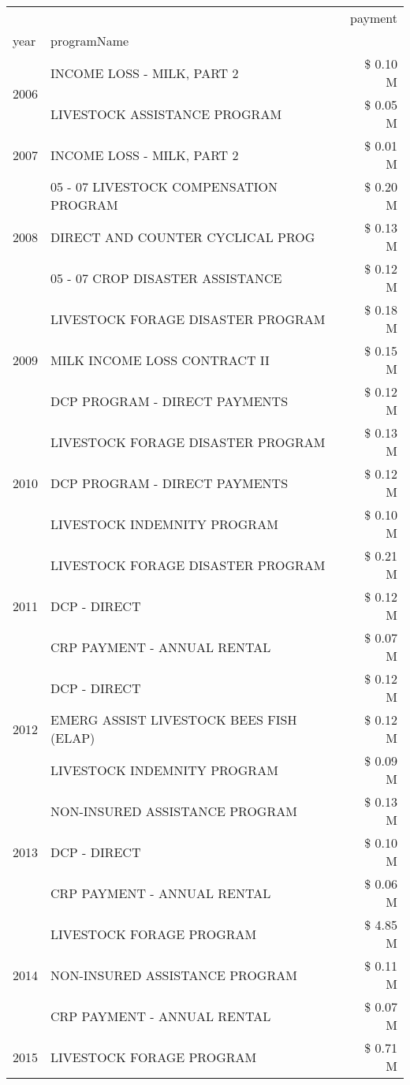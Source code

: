 \begin{tabular}{llr}
\toprule
 &  & payment \\
year & programName &  \\
\midrule
\multirow[t]{2}{*}{2006} & INCOME LOSS - MILK, PART 2 & \$ 0.10 M \\
 & LIVESTOCK ASSISTANCE PROGRAM & \$ 0.05 M \\
\cline{1-3}
2007 & INCOME LOSS - MILK, PART 2 & \$ 0.01 M \\
\cline{1-3}
\multirow[t]{3}{*}{2008} & 05 - 07 LIVESTOCK COMPENSATION PROGRAM & \$ 0.20 M \\
 & DIRECT AND COUNTER CYCLICAL PROG & \$ 0.13 M \\
 & 05 - 07 CROP DISASTER ASSISTANCE & \$ 0.12 M \\
\cline{1-3}
\multirow[t]{3}{*}{2009} & LIVESTOCK FORAGE DISASTER  PROGRAM & \$ 0.18 M \\
 & MILK INCOME LOSS CONTRACT II & \$ 0.15 M \\
 & DCP PROGRAM - DIRECT PAYMENTS & \$ 0.12 M \\
\cline{1-3}
\multirow[t]{3}{*}{2010} & LIVESTOCK FORAGE DISASTER  PROGRAM & \$ 0.13 M \\
 & DCP PROGRAM - DIRECT PAYMENTS & \$ 0.12 M \\
 & LIVESTOCK INDEMNITY PROGRAM & \$ 0.10 M \\
\cline{1-3}
\multirow[t]{3}{*}{2011} & LIVESTOCK FORAGE DISASTER PROGRAM & \$ 0.21 M \\
 & DCP - DIRECT & \$ 0.12 M \\
 & CRP PAYMENT - ANNUAL RENTAL & \$ 0.07 M \\
\cline{1-3}
\multirow[t]{3}{*}{2012} & DCP - DIRECT & \$ 0.12 M \\
 & EMERG ASSIST LIVESTOCK BEES FISH (ELAP) & \$ 0.12 M \\
 & LIVESTOCK INDEMNITY PROGRAM & \$ 0.09 M \\
\cline{1-3}
\multirow[t]{3}{*}{2013} & NON-INSURED ASSISTANCE PROGRAM & \$ 0.13 M \\
 & DCP - DIRECT & \$ 0.10 M \\
 & CRP PAYMENT - ANNUAL RENTAL & \$ 0.06 M \\
\cline{1-3}
\multirow[t]{3}{*}{2014} & LIVESTOCK FORAGE PROGRAM & \$ 4.85 M \\
 & NON-INSURED ASSISTANCE PROGRAM & \$ 0.11 M \\
 & CRP PAYMENT - ANNUAL RENTAL & \$ 0.07 M \\
\cline{1-3}
\multirow[t]{3}{*}{2015} & LIVESTOCK FORAGE PROGRAM & \$ 0.71 M \\

\end{tabular}
